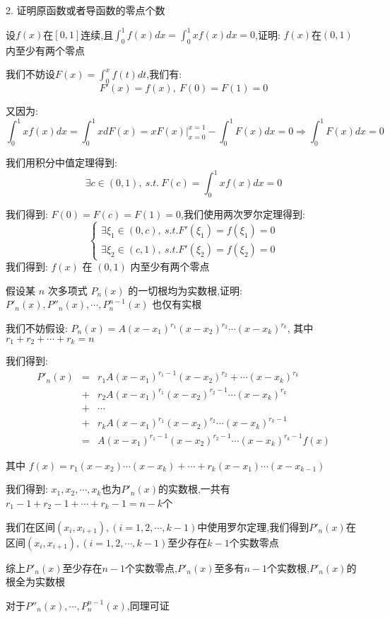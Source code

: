 2. 证明原函数或者导函数的零点个数
\begin{proposition}
	设$f(x)$在$[0,1]$连续,且$\int_{0}^{1}f(x)dx=\int_{0}^{1}xf(x)dx=0$,证明: $f(x)$在$(0,1)$内至少有两个零点
\end{proposition}
\begin{solution}

	我们不妨设$F(x)=\int_{0}^{x}f(t)dt$,我们有:
	$$F'(x)=f(x),\ F(0)=F(1)=0$$

	又因为: $$\int_{0}^{1}xf(x)dx=\int_{0}^{1}xdF(x)=xF(x)|_{x=0}^{x=1}-\int_{0}^{1}F(x)dx=0\Rightarrow \int_{0}^{1}F(x)dx=0$$

	我们用积分中值定理得到:
	$$\exists c\in(0,1),\ s.t.\ F(c)=\int_{0}^{1}xf(x)dx=0$$

	我们得到: $F(0)=F(c)=F(1)=0$,我们使用两次罗尔定理得到:
	$$\left\lbrace
		\begin{array}{l}
			\exists \xi_{1}\in(0,c),\ s.t. F'(\xi_{1})=f(\xi_{1})=0 \\
			\exists \xi_{2}\in(c,1),\ s.t. F'(\xi_{2})=f(\xi_{2})=0
		\end{array}
		\right.$$
	我们得到: $f(x)$ 在 $(0,1)$ 内至少有两个零点
\end{solution}


\begin{proposition}
	假设某 $n$ 次多项式 $P_{n}(x)$ 的一切根均为实数根,证明: $P'_{n}(x),P''_{n}(x),\cdots,P_{n}^{n-1}(x)$ 也仅有实根
\end{proposition}
\begin{solution}

	我们不妨假设:  $P_{n}(x)=A(x-x_{1})^{r_{1}}(x-x_{2})^{r_{2}}\cdots(x-x_{k})^{r_{k}}$, 其中 $r_{1}+r_{2}+\cdots+r_{k}=n$

	我们得到:
	\begin{eqnarray*}
		P'_{n}(x)&=&r_{1}A(x-x_{1})^{r_{1}-1}(x-x_{2})^{r_{2}}+\cdots(x-x_{k})^{r_{k}}\\
		&+&r_{2}A(x-x_{1})^{r_{1}}(x-x_{2})^{r_{2}-1}\cdots(x-x_{k})^{r_{k}}\\
		&+&\cdots\\
		&+&r_{k}A(x-x_{1})^{r_{1}}(x-x_{2})^{r_{2}}\cdots(x-x_{k})^{r_{k}-1}\\
		&=&A(x-x_{1})^{r_{1}-1}(x-x_{2})^{r_{2}-1}\cdots(x-x_{k})^{r_{k}-1}f(x)
	\end{eqnarray*}

	其中 $f(x)=r_{1}(x-x_{2})\cdots(x-x_{k})+\cdots+r_{k}(x-x_{1})\cdots(x-x_{k-1})$

	我们得到:  $x_{1},x_{2},\cdots,x_{k}$也为$P'_{n}(x)$的实数根,一共有$r_{1}-1+r_{2}-1+\cdots+r_{k}-1=n-k$个

	我们在区间$(x_{i},x_{i+1}),(i=1,2,\cdots,k-1)$中使用罗尔定理,我们得到$P'_{n}(x)$在区间$(x_{i},x_{i+1}),(i=1,2,\cdots,k-1)$至少存在$k-1$个实数零点

	综上$P'_{n}(x)$至少存在$n-1$个实数零点,$P'_{n}(x)$至多有$n-1$个实数根,$P'_{n}(x)$的根全为实数根

	对于$P''_{n}(x),\cdots,P_{n}^{n-1}(x)$,同理可证

\end{solution}

